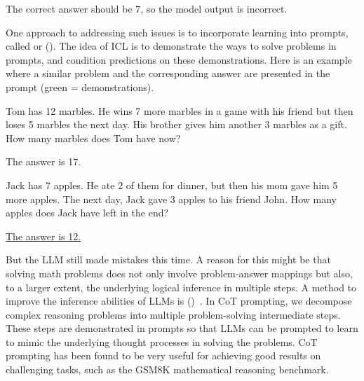 \noindent The correct answer should be 7, so the model output is incorrect.

One approach to addressing such issues is to incorporate learning into prompts, called  or (). The idea of ICL is to demonstrate the ways to solve problems in prompts, and condition predictions on these demonstrations. Here is an example where a similar problem and the corresponding answer are presented in the prompt (green = demonstrations).

\vspace{0.5em}
\begin{tcolorbox}
\begin{center}
\parbox{0.9\textwidth}
{

{\color{ugreen} Tom has 12 marbles. He wins 7 more marbles in a game with his friend but then loses 5 marbles the next day. His brother gives him another 3 marbles as a gift. How many marbles does Tom have now?}

\vspace{0.3em}

{\color{ugreen} The answer is 17.}

\vspace{0.3em}

{\color{blue} Jack has 7 apples. He ate 2 of them for dinner, but then his mom gave him 5 more apples. The next day, Jack gave 3 apples to his friend John. How many apples does Jack have left in the end?}

\vspace{0.3em}

\underline{The answer is 12.}

}
\end{center}
\end{tcolorbox}
\vspace{0.5em}

But the LLM still made mistakes this time. A reason for this might be that solving math problems does not only involve problem-answer mappings but also, to a larger extent, the underlying logical inference in multiple steps. A method to improve the inference abilities of LLMs is  ()~\cite{wei-etal:2022chain}. In CoT prompting, we decompose complex reasoning problems into multiple problem-solving intermediate steps. These steps are demonstrated in prompts so that LLMs can be prompted to learn to mimic the underlying thought processes in solving the problems. CoT prompting has been found to be very useful for achieving good results on challenging tasks, such as the GSM8K mathematical reasoning benchmark.

